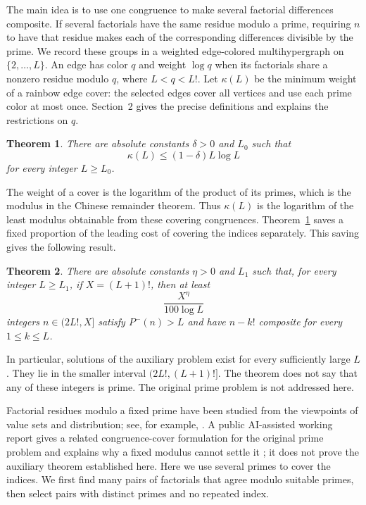 \documentclass[11pt]{amsart}
\newtheorem{theorem}{Theorem}[section]
\theoremstyle{definition}
\theoremstyle{remark}
\begin{document}
The main idea is to use one congruence to make several factorial differences
composite.  If several factorials have the same residue modulo a prime,
requiring $n$ to have that residue makes each of the corresponding differences
divisible by the prime.  We record these groups in a weighted edge-colored
multihypergraph on $\{2,\ldots,L\}$.  An edge has color $q$ and weight
$\log q$ when its factorials share a nonzero residue modulo $q$, where
$L<q<L!$.  Let $\kappa(L)$ be the minimum weight of a rainbow edge cover:
the selected edges cover all vertices and use each prime color at most once.
Section~2 gives the precise definitions and explains the restrictions on $q$.

\enlargethispage{\baselineskip}
\begin{theorem}\label{thm:covercost}
There are absolute constants $\delta>0$ and $L_0$ such that
\[
\kappa(L)\leq(1-\delta)L\log L
\]
for every integer $L\geq L_0$.
\end{theorem}

The weight of a cover is the logarithm of the product of its primes, which
is the modulus in the Chinese remainder theorem.  Thus $\kappa(L)$ is the
logarithm of the least modulus obtainable from these covering congruences.
Theorem~\ref{thm:covercost} saves a fixed proportion of the leading cost of
covering the indices separately.  This saving gives the following result.

\begin{theorem}\label{thm:main}
There are absolute constants $\eta>0$ and $L_1$ such that, for every integer
$L\geq L_1$, if $X=(L+1)!$, then at least
\[
\frac{X^\eta}{100\log L}
\]
integers $n\in(2L!,X]$ satisfy $P^-(n)>L$ and have $n-k!$ composite for
every $1\leq k\leq L$.
\end{theorem}

In particular, solutions of the auxiliary problem exist for every
sufficiently large $L$.  They lie in the smaller interval
$(2L!,(L+1)!]$.  The theorem does not say that any of these integers is
prime.  The original prime problem is not addressed here.

Factorial residues modulo a fixed prime have been studied from the viewpoints
of value sets and distribution; see, for example,
\cite{BanksLucaShparlinskiStichtenoth,GaraevLucaShparlinski,
GrebennikovSagdeevSemchankauVasilevskii,KlurmanMunsch,Hu}.  A public
AI-assisted working report gives a related congruence-cover formulation for
the original prime problem and explains why a fixed modulus cannot settle it
\cite{WhiteClaude}; it does not prove the auxiliary theorem established here.
Here we use several primes to cover the indices.  We first find many pairs of
factorials that agree modulo suitable primes, then select pairs with distinct
primes and no repeated index.
\end{document}
